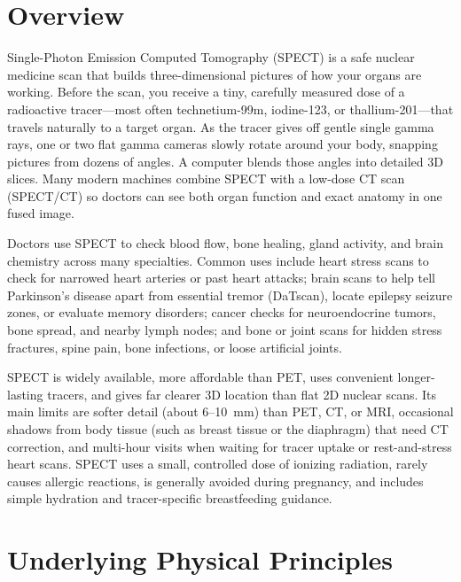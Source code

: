 \label{ch:infographic-spect}

\section{Overview}

Single-Photon Emission Computed Tomography (SPECT) is a safe nuclear medicine scan that builds three-dimensional pictures of how your organs are working. Before the scan, you receive a tiny, carefully measured dose of a radioactive tracer---most often technetium-99m, iodine-123, or thallium-201---that travels naturally to a target organ. As the tracer gives off gentle single gamma rays, one or two flat gamma cameras slowly rotate around your body, snapping pictures from dozens of angles. A computer blends those angles into detailed 3D slices. Many modern machines combine SPECT with a low-dose CT scan (SPECT/CT) so doctors can see both organ function and exact anatomy in one fused image.

Doctors use SPECT to check blood flow, bone healing, gland activity, and brain chemistry across many specialties. Common uses include heart stress scans to check for narrowed heart arteries or past heart attacks; brain scans to help tell Parkinson's disease apart from essential tremor (DaTscan), locate epilepsy seizure zones, or evaluate memory disorders; cancer checks for neuroendocrine tumors, bone spread, and nearby lymph nodes; and bone or joint scans for hidden stress fractures, spine pain, bone infections, or loose artificial joints.

SPECT is widely available, more affordable than PET, uses convenient longer-lasting tracers, and gives far clearer 3D location than flat 2D nuclear scans. Its main limits are softer detail (about 6--10~mm) than PET, CT, or MRI, occasional shadows from body tissue (such as breast tissue or the diaphragm) that need CT correction, and multi-hour visits when waiting for tracer uptake or rest-and-stress heart scans. SPECT uses a small, controlled dose of ionizing radiation, rarely causes allergic reactions, is generally avoided during pregnancy, and includes simple hydration and tracer-specific breastfeeding guidance.

\section{Underlying Physical Principles}

